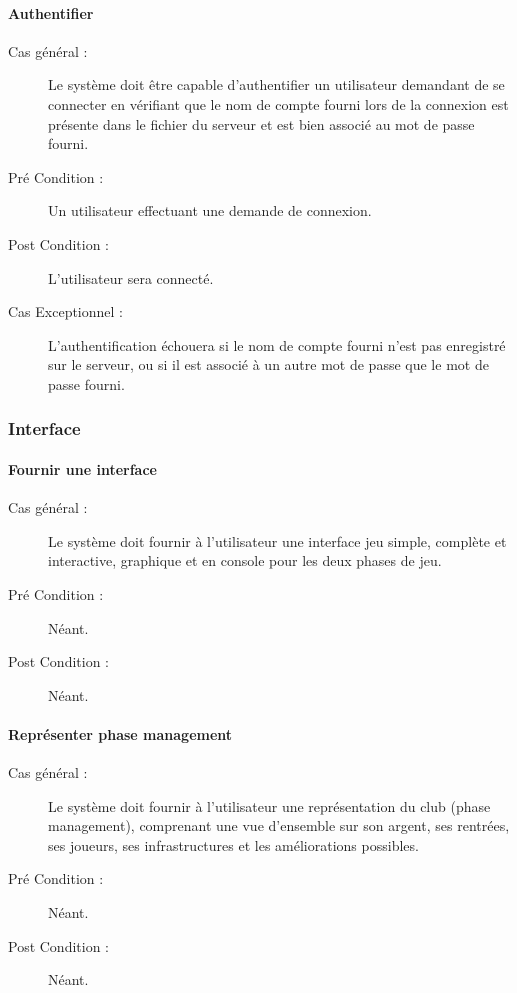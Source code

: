 \documentclass[a4paper]{article}
\begin{document}
\paragraph{Authentifier}
\begin{description}
\item[Cas général :] Le système doit être capable d'authentifier un \gls{utilisateur} demandant de se connecter en vérifiant que le nom de compte fourni lors de la connexion est présente dans le fichier du \gls{serveur} et est bien associé au mot de passe fourni.
\item[Pré Condition  :] Un \gls{utilisateur} effectuant une demande de connexion.
\item[Post Condition :] L'utilisateur sera connecté.
\item[Cas Exceptionnel :] L'authentification échouera si le nom de compte fourni n'est pas enregistré sur le serveur, ou si il est associé à un autre mot de passe que le mot de passe fourni.
\end{description}

\subsubsection{Interface}
\paragraph{Fournir une interface}
\begin{description}
\item[Cas général :] Le système doit fournir à l'\gls{utilisateur} une interface jeu simple, complète et interactive, graphique et en console pour les deux phases de jeu.
\item[Pré Condition  :] Néant.
\item[Post Condition :] Néant.
\end{description}

\paragraph{Représenter phase management}
\begin{description}
\item[Cas général :] Le système doit fournir à l'\gls{utilisateur} une représentation du \gls{club} (phase management), comprenant une vue d'ensemble sur son argent, ses rentrées, ses \glspl{joueur}, ses infrastructures et les améliorations possibles.
\item[Pré Condition  :] Néant.
\item[Post Condition :] Néant.
\end{description}
\end{document}
